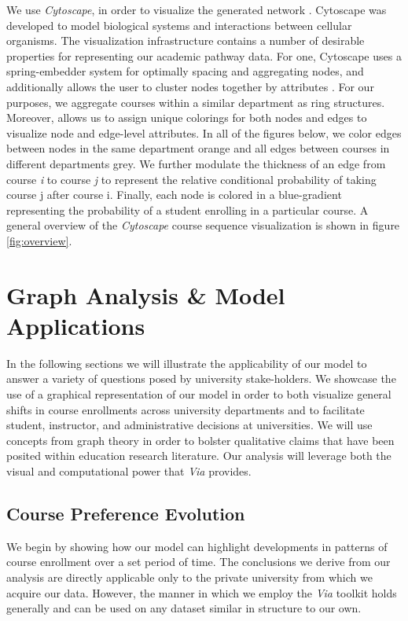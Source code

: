\documentclass{sigchi}
\begin{document}
We use \textit{Cytoscape}, in order to visualize the  generated network \cite{shannon2003cytoscape}. Cytoscape was developed to model biological systems and interactions between cellular organisms. The visualization infrastructure contains a number of desirable properties for representing our academic pathway data. For one, Cytoscape uses a spring-embedder system for optimally spacing and aggregating nodes, and additionally allows the user to cluster nodes together by attributes \cite{Battista1994}. For our purposes, we aggregate courses within a similar department as ring structures. Moreover,  allows us to assign unique colorings for both nodes and edges to visualize node and edge-level attributes. In all of the figures below, we color edges between nodes in the same department orange and all edges between courses in different departments grey. We further modulate the thickness of an edge from course \textit{i} to course \textit{j} to represent the relative conditional probability of taking course j after course i. Finally, each node is colored in a blue-gradient representing the probability of a student enrolling in a particular course. A general overview of the \textit{Cytoscape} course sequence visualization is shown in figure \ref{fig:overview}. 

\section{Graph Analysis & Model Applications}
\label{sec:analysis}
In the following sections we will illustrate the applicability of our model to answer a variety of questions posed by university stake-holders. We showcase the use of a graphical representation of our model in order to both visualize general shifts in course enrollments across university departments and to facilitate student, instructor, and administrative decisions at universities. We will use concepts from graph theory in order to bolster qualitative claims that have been posited within education research literature. Our analysis will leverage both the visual and computational power that \textit{Via} provides. 

\subsection{Course Preference Evolution}
\label{sec:course_pref_evolution}

We begin by showing how our model can highlight developments in patterns of course enrollment over a set period of time. The conclusions we derive from our analysis are directly applicable only to the private university from which we acquire our data. However, the manner in which we employ the \textit{Via} toolkit holds generally and can be used on any dataset similar in structure to our own.
\end{document}
